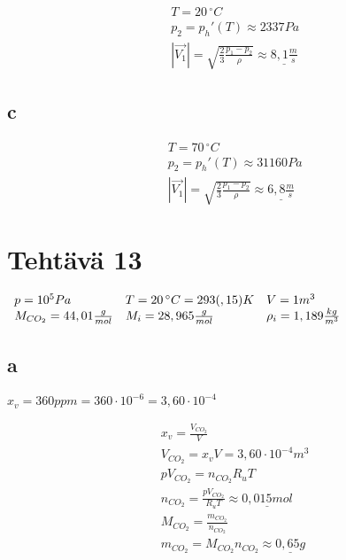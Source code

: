 \documentclass[12pt,a4paper,finnish]{article}
\begin{document}
\begin{align}
 &T = 20\,^{\circ}C\\
 &p_2 = p_h'(T) \approx 2337 Pa\\
 &|\vec{V_1}| = \sqrt{\frac{2}{3}\frac{p_1 - p_2}{\rho}} \approx \underline{8,1\frac{m}{s}}
\end{align}

\subsection{c}

\begin{align}
 &T = 70\,^{\circ}C\\
 &p_2 = p_h'(T) \approx 31160 Pa\\
 &|\vec{V_1}| = \sqrt{\frac{2}{3}\frac{p_1 - p_2}{\rho}} \approx \underline{6,8\frac{m}{s}}
\end{align}

\section{Tehtävä 13}

\begin{math}
 \begin{array}{l l l}
  p = 10^5 Pa & T = 20 \,^{\circ}C = 293(,15) K & V = 1 m^3\\
  M_{CO_2} = 44,01 \frac{g}{mol} & M_i = 28,965 \frac{g}{mol} & \rho_i = 1,189 \frac{kg}{m^3}
 \end{array}
\end{math}

\subsection{a}

\begin{math}
 x_v = 360 ppm = 360\cdot 10^{-6} = 3,60 \cdot 10^{-4}
\end{math}

\begin{align}
 &x_v = \frac{V_{CO_2}}{V}\\
 &V_{CO_2} = x_vV = 3,60 \cdot 10^{-4} m^3\\
 &pV_{CO_2} = n_{CO_2}R_uT\\
 &n_{CO_2} = \frac{pV_{CO_2}}{R_uT} \approx \underline{0,015 mol}\\
 &M_{CO_2} = \frac{m_{CO_2}}{n_{CO_2}}\\
 &m_{CO_2} = M_{CO_2}n_{CO_2} \approx \underline{0,65g}\\
\end{align}
\end{document}
